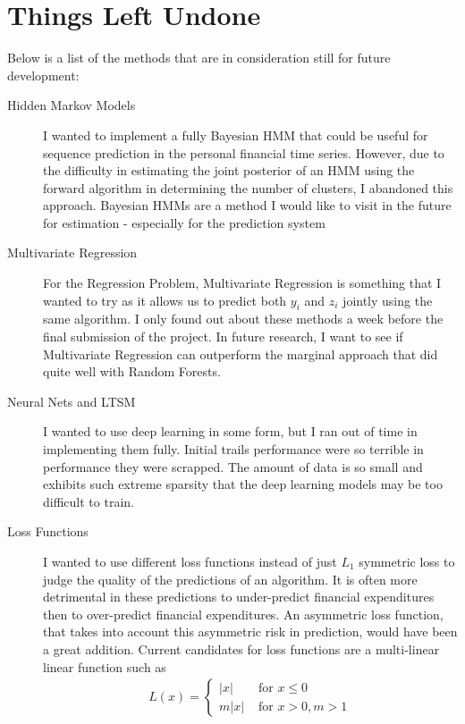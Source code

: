 \documentclass[11pt,a4paper]{article}
\begin{document}

\section{Things Left Undone}

Below is a list of the methods that are in consideration still for future development:
\begin{description}
	\item[Hidden Markov Models] I wanted to implement a fully Bayesian HMM that could be useful for sequence prediction in the personal financial time series. However, due to the difficulty in estimating the joint posterior of an HMM using the forward algorithm in determining the number of clusters, I abandoned this approach. Bayesian HMMs are a method I would like to visit in the future for estimation - especially for the \yinyang prediction system
	\item[Multivariate Regression] For the \yinyang Regression Problem, Multivariate Regression is something that I wanted to try as it allows us to predict both $ y_i $ and $ z_i $ jointly using the same algorithm. I only found out about these methods a week before the final submission of the project. In future research, I want to see if Multivariate Regression can outperform the marginal approach that did quite well with Random Forests. 
	\item[Neural Nets and LTSM] I wanted to use deep learning in some form, but I ran out of time in implementing them fully. Initial trails performance were so terrible in performance they were scrapped. The amount of data is so small and exhibits such extreme sparsity that the deep learning models may be too difficult to train. 
	\item[Loss Functions] I wanted to use different loss functions instead of just $ L_1 $ symmetric loss to judge the quality of the predictions of an algorithm. It is often more detrimental in these predictions to under-predict financial expenditures then to over-predict financial expenditures. An asymmetric loss function, that takes into account this asymmetric risk in prediction, would have been a great addition. Current candidates for loss functions are a multi-linear linear function such as 
	\begin{align*}
	L(x) = \begin{cases}
	\left|x\right| & \text{ for }  x \leq 0 \\
	m\left|x\right| & \text{ for }  x > 0, m > 1 
	\end{cases}

\end{align*}
\end{description}
\end{document}
